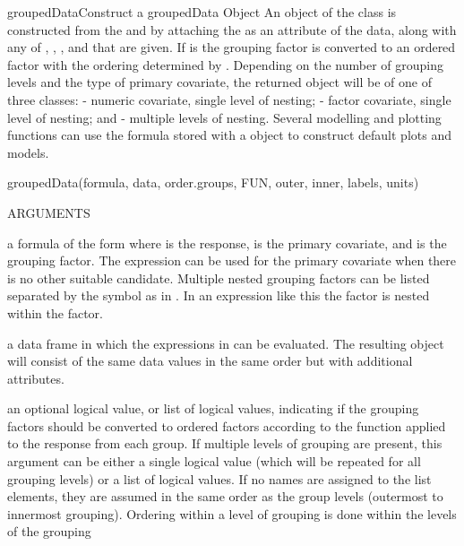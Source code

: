 \documentclass[pdftex]{article} \usepackage{url,graphicx}
\renewcommand{\Twiddle}{\mbox{\(\sim\)}}
\begin{document}
\begin{Helpfile}{groupedData}{Construct a groupedData Object}
An object of the  class is constructed from the
 and  by attaching the  as an
attribute of the data, along with any of , ,
, and  that are given.  If
 is  the grouping factor is converted to
an ordered factor with the ordering determined by
. Depending on the number of grouping levels and the type of
primary covariate, the returned object will be of one of three
classes:  - numeric covariate, single level of
nesting;  - factor covariate, single level of
nesting; and  - multiple levels of
nesting. Several modelling and plotting functions can use the formula
stored with a  object to construct default plots and
models.
\begin{Example}
groupedData(formula, data, order.groups, FUN, outer, inner,
 labels, units)
\end{Example}
\begin{Argument}{ARGUMENTS}
\item[\Co{formula:}]
a formula of the form \Co{resp \Twiddle cov | group} where
 is the response,  is the primary covariate, and
 is the grouping factor.  The expression  can be
used for the primary covariate when there is no other suitable
candidate.  Multiple nested grouping factors can be listed separated
by the \Co{/} symbol as in .  In an expression
like this the  factor is nested within the 
factor.
\item[\Co{data:}]
a data frame in which the expressions in  can
be evaluated.  The resulting  object will consist
of the same data values in the same order but with additional
attributes.
\item[\Co{order.groups:}]
an optional logical value, or list of logical
values, indicating if the grouping factors should be converted to
ordered factors according to the function  applied to the
response from each group. If multiple levels of grouping are present,
this argument can be either a single logical value (which will be
repeated for all grouping levels) or a list of logical values. If no
names are assigned to the list elements, they are assumed in the same
order as the group levels (outermost to innermost grouping). Ordering
within a level of grouping is done within the levels of the grouping

\end{Argument}
\end{Helpfile}
\end{document}

